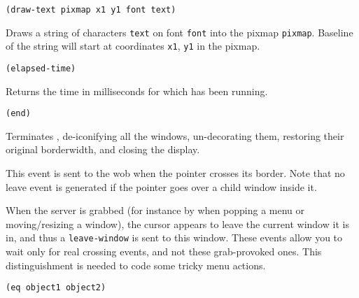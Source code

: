 {\usagefont\begin{verbatim}
(draw-text pixmap x1 y1 font text)
\end{verbatim}}\usageupspace

Draws a string of characters \verb|text| on font \verb|font| into the pixmap
\verb|pixmap|. Baseline of the string will start at coordinates \verb|x1|,
\verb|y1| in the pixmap.



{\usagefont\begin{verbatim}
(elapsed-time)
\end{verbatim}}\usageupspace

Returns the time in milliseconds for which {\GWM} has been running.

        
{\usagefont\begin{verbatim}
(end)
\end{verbatim}}\usageupspace

Terminates {\GWM}, de-iconifying all the windows, un-decorating them,
restoring their original borderwidth, and closing the display.

        

This event is sent to the wob when the pointer crosses its border.
Note that no leave event is generated if the pointer goes over a child window
inside it.

        

When the server is grabbed (for instance by {\GWM} when popping a menu or
moving/resizing a window), the cursor appears to leave the current window it
is in, and thus a \verb|leave-window| is sent to this window. These events
allow you to wait only for real crossing events, and not these grab-provoked
ones. This distinguishment is needed to code some tricky menu actions.


{\usagefont\begin{verbatim}
(eq object1 object2)
\end{verbatim}}\usageupspace

